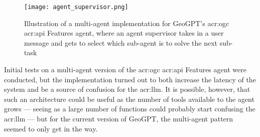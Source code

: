 \begin{figure}
    \centering
    \texttt{[image: agent\_supervisor.png]}
    \caption[Architecture a for multi-agent implementation for GeoGPT's OGC API Features agent]{Illustration of a multi-agent implementation for GeoGPT's \acrshort{acr:ogc} \acrshort{acr:api} Features agent, where an agent supervisor takes in a user message and gets to select which sub-agent is to solve the next sub-task}
    \label{fig:agent-supervisor}
\end{figure}

Initial tests on a multi-agent version of the \acrshort{acr:ogc} \acrshort{acr:api} Features agent were conducted, but the implementation turned out to both increase the latency of the system and be a source of confusion for the \acrshort{acr:llm}. It is possible, however, that such an architecture could be useful as the number of tools available to the agent grows --- seeing as a large number of functions could probably start confusing the \acrshort{acr:llm} --- but for the current version of GeoGPT, the multi-agent pattern seemed to only get in the way.